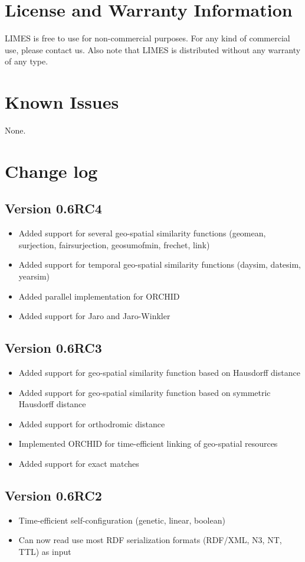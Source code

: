 \documentclass[a4paper, 11pt]{article}
\begin{document}
\section{License and Warranty Information}
LIMES is free to use for non-commercial purposes.
For any kind of commercial use, please contact us.
Also note that LIMES is distributed without any warranty of any type.

\section{Known Issues}

None.

\section{Change log}
\subsection{Version 0.6RC4}
\begin{itemize}
\item Added support for several geo-spatial similarity functions (geomean, surjection, fairsurjection, geosumofmin, frechet, link)
\item Added support for temporal geo-spatial similarity functions (daysim, datesim, yearsim) 
\item Added parallel implementation for ORCHID
\item Added support for Jaro and Jaro-Winkler
\end{itemize}

\subsection{Version 0.6RC3}
\begin{itemize}
\item Added support for geo-spatial similarity function based on Hausdorff distance
\item Added support for geo-spatial similarity function based on symmetric Hausdorff distance
\item Added support for orthodromic distance
\item Implemented ORCHID for time-efficient linking of geo-spatial resources
\item Added support for exact matches
\end{itemize}


\subsection{Version 0.6RC2}
\begin{itemize}
\item Time-efficient self-configuration (genetic, linear, boolean)
\item Can now read use most RDF serialization formats (RDF/XML, N3, NT, TTL) as input
\end{itemize}
\end{document}
